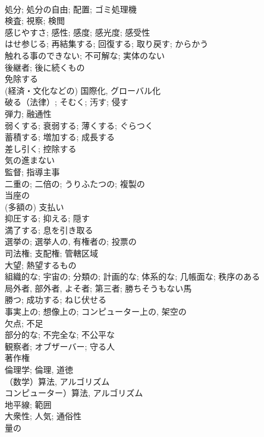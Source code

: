 \documentclass[8pt]{extreport}
\begin{document}
\begin{CJK}{UTF8}{min}
\\	処分; 処分の自由; 配置; ゴミ処理機	
\\	検査; 視察; 検閲	
\\	感じやすさ; 感性; 感度; 感光度; 感受性	
\\	はせ参じる; 再結集する; 回復する; 取り戻す; からかう	
\\	触れる事のできない; 不可解な; 実体のない	
\\	後継者; 後に続くもの	
\\	免除する	
\\	(経済・文化などの) 国際化, グローバル化	
\\	破る（法律）; そむく; 汚す; 侵す	
\\	弾力; 融通性	
\\	弱くする; 衰弱する; 薄くする; ぐらつく	
\\	蓄積する; 増加する; 成長する	
\\	差し引く; 控除する	
\\	気の進まない	
\\	監督; 指導主事	
\\	二重の; 二倍の; うりふたつの; 複製の	
\\	当座の	
\\	(多額の) 支払い	
\\	抑圧する; 抑える; 隠す	
\\	満了する; 息を引き取る	
\\	選挙の; 選挙人の, 有権者の; 投票の	
\\	司法権; 支配権; 管轄区域
\\	大望; 熱望するもの	
\\	組織的な; 宇宙の; 分類の; 計画的な; 体系的な; 几帳面な; 秩序のある	
\\	局外者, 部外者, よそ者; 第三者; 勝ちそうもない馬	
\\	勝つ; 成功する; ねじ伏せる	
\\	事実上の; 想像上の; コンピューター上の, 架空の	
\\	欠点; 不足	
\\	部分的な; 不完全な; 不公平な	
\\	観察者; オブザーバー; 守る人	
\\	著作権	
\\	倫理学; 倫理, 道徳	
\\	（数学）算法, アルゴリズム 
\\	コンピューター）算法, アルゴリズム	
\\	地平線; 範囲	
\\	大衆性; 人気; 通俗性	
\\	量の	

\end{CJK}
\end{document}
